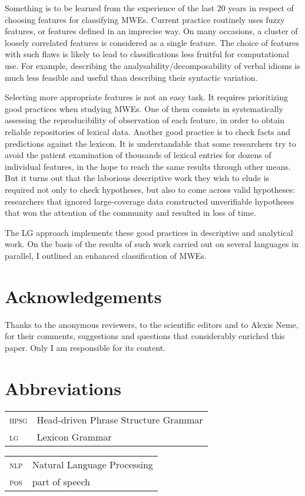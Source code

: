 \documentclass[output=paper]{langsci/langscibook}
\begin{document}
Something is to be learned from the experience of the last 20 years in respect of choosing features for classifying MWEs. Current practice routinely uses fuzzy features, or features defined in an imprecise way. On many occasions, a cluster of loosely correlated features is considered as a single feature. The choice of features with such flaws is likely to lead to classifications less fruitful for computational use. For example, describing the analysability\slash decomposability of verbal idioms is much less feasible and useful than describing their syntactic variation.

Selecting more appropriate features is not an easy task. It requires prioritizing good practices when studying MWEs. One of them consists in systematically assessing the reproducibility of observation of each feature, in order to obtain reliable repositories of lexical data. Another good practice is to check facts and predictions against the lexicon. It is understandable that some researchers try to avoid the patient examination of thousands of lexical entries for dozens of individual features, in the hope to reach the same results through other means. But it turns out that the laborious descriptive work they wish to elude is required not only to check hypotheses, but also to come across valid hypotheses: researchers that ignored large-coverage data constructed unverifiable hypotheses that won the attention of the community and resulted in loss of time.

The LG approach implements these good practices in descriptive and analytical work. On the basis of the results of such work carried out on several languages in parallel, I outlined an enhanced classification of MWEs.

\section*{Acknowledgements}

Thanks to the anonymous reviewers, to the scientific editors and to Alexis Neme, for their comments, suggestions and questions that considerably enriched this paper. Only I am responsible for its content.

\section*{Abbreviations}
 
\begin{tabularx}{.51\textwidth}{lQ}
\textsc{hpsg} & Head-driven Phrase Structure Grammar \\
\textsc{lg} & Lexicon Grammar  \\
\end{tabularx}
\begin{tabularx}{.47\textwidth}{lQ}
\textsc{nlp} & Natural Language Processing \\
\textsc{p}o\textsc{s} & part of speech  \\
\end{tabularx} 
 
\sloppy
\printbibliography[heading=subbibliography,notkeyword=this]
\end{document}
